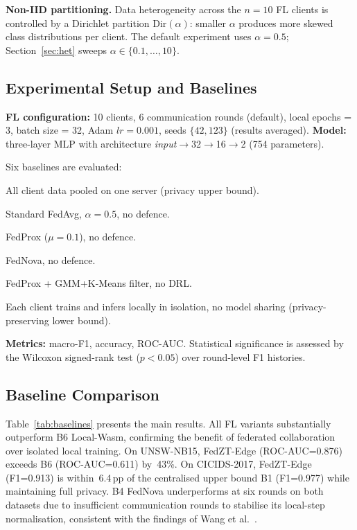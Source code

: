 \documentclass[11pt,a4paper,twocolumn]{article}
\theoremstyle{definition}
\begin{document}
\textbf{Non-IID partitioning.}
Data heterogeneity across the $n=10$ FL clients is controlled by a
Dirichlet partition $\text{Dir}(\alpha)$: smaller $\alpha$ produces more
skewed class distributions per client.  The default experiment uses
$\alpha=0.5$; Section~\ref{sec:het} sweeps $\alpha\in\{0.1,\ldots,10\}$.

\subsection{Experimental Setup and Baselines}
\label{sec:setup}

\textbf{FL configuration:} 10 clients, 6 communication rounds (default),
local epochs = 3, batch size = 32, Adam $lr=0.001$, seeds $\{42,123\}$
(results averaged).  \textbf{Model:} three-layer MLP with architecture
\textit{input}$\to$32$\to$16$\to$2 (754 parameters).

Six baselines are evaluated:
\begin{description}[leftmargin=0pt,labelwidth=0pt,labelsep=0.3em]
  \item[\textbf{B1}~Centralised] All client data pooled on one server
    (privacy upper bound).
  \item[\textbf{B2}~FedAvg] Standard FedAvg, $\alpha{=}0.5$, no defence.
  \item[\textbf{B3}~FedProx] FedProx ($\mu{=}0.1$), no defence.
  \item[\textbf{B4}~FedNova] FedNova, no defence.
  \item[\textbf{B5}~FedProx+Filter] FedProx + GMM+K-Means filter, no DRL.
  \item[\textbf{B6}~Local-Wasm] Each client trains and infers locally in
    isolation, no model sharing (privacy-preserving lower bound).
\end{description}

\textbf{Metrics:} macro-F1, accuracy, ROC-AUC.  Statistical significance
is assessed by the Wilcoxon signed-rank test ($p<0.05$) over round-level
F1 histories.

\subsection{Baseline Comparison}
\label{sec:baseline}

Table~\ref{tab:baselines} presents the main results.  All FL variants
substantially outperform B6 Local-Wasm, confirming the benefit of
federated collaboration over isolated local training.  On UNSW-NB15,
FedZT-Edge (ROC-AUC=0.876) exceeds B6 (ROC-AUC=0.611) by~43\%.  On
CICIDS-2017, FedZT-Edge (F1=0.913) is within~6.4\,pp of the centralised
upper bound B1 (F1=0.977) while maintaining full privacy.  B4 FedNova
underperforms at six rounds on both datasets due to insufficient
communication rounds to stabilise its local-step normalisation, consistent
with the findings of Wang et al.~\cite{wang2020fednova}.
\end{document}
